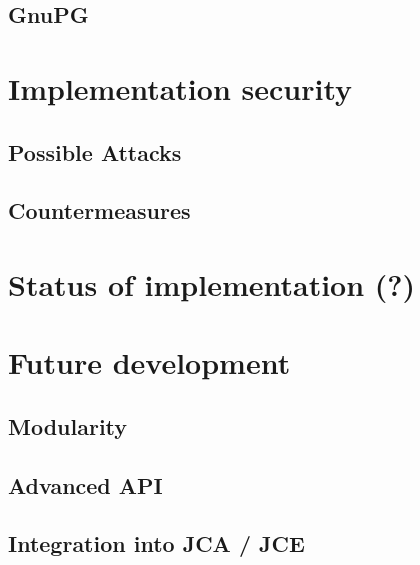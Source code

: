 \subsection{GnuPG}


\section{Implementation security}

\subsection{Possible Attacks}

\subsection{Countermeasures}


\section{Status of implementation (?)}


\section{Future development}

\subsection{Modularity}

\subsection{Advanced API}

\subsection{Integration into JCA / JCE}